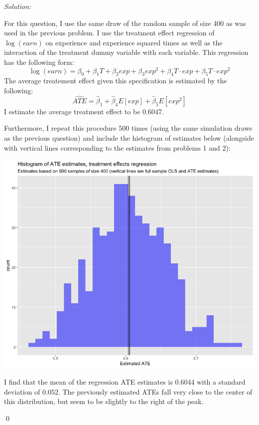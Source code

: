 \documentclass[12pt]{article}
\newenvironment{problem}[2][Problem]{\begin{trivlist}
\item[\hskip \labelsep {\bfseries #1}\hskip \labelsep {\bfseries #2.}]}{\end{trivlist}}
\newenvironment{sol}
    {\emph{Solution:}
    }
    {
    \qed
    }
\begin{document}
\begin{problem}{4}
\end{problem}
\begin{sol}
For this question, I use the same draw of the random sample of size 400 as was used in the previous problem. I use the treatment effect regression of $\log(earn)$ on experience and experience squared times as well as the interaction of the treatment dummy variable with each variable. This regression has the following form:
\[\log(earn) = \beta_0 + \beta_1 T + \beta_2 exp + \beta_3 exp^2 + \beta_4 T \cdot exp + \beta_5 T \cdot exp^2\]
The average treatement effect given this specification is estimated by the following:
\[\widehat{ATE} = \hat{\beta}_{1} + \hat{\beta}_4 E[exp] + \hat{\beta}_5 E[exp^2]\]
I estimate the average treatment effect to be 0.6047.

Furthermore, I repeat this procedure 500 times (using the same simulation draws as the previous question) and include the histogram of estimates below (alongside with vertical lines corresponding to the estimates from problems 1 and 2):

\begin{center}
    \includegraphics[scale=0.5]{Reg_hist.png}
\end{center}

I find that the mean of the regression ATE estimates is 0.6044 with a standard deviation of 0.052. The previously estimated ATEs fall very close to the center of this distribution, but seem to be slightly to the right of the peak.
\end{sol}
\end{document}
